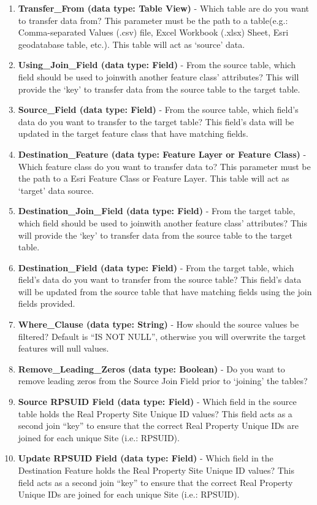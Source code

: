 \documentclass[openany]{book}
\theoremstyle{definition}
\theoremstyle{definition}
\theoremstyle{definition}
\theoremstyle{remark}
\begin{document}
\begin{enumerate}
\def\labelenumi{\arabic{enumi}.}
\item
  \textbf{Transfer\_From (data type: Table View)} - Which table are do
  you want to transfer data from? This parameter must be the path to a
  table(e.g.: Comma-separated Values (.csv) file, Excel Workbook (.xlsx)
  Sheet, Esri geodatabase table, etc.). This table will act as `source'
  data.
\item
  \textbf{Using\_Join\_Field (data type: Field)} - From the source
  table, which field should be used to joinwith another feature class'
  attributes? This will provide the `key' to transfer data from the
  source table to the target table.
\item
  \textbf{Source\_Field (data type: Field)} - From the source table,
  which field's data do you want to transfer to the target table? This
  field's data will be updated in the target feature class that have
  matching fields.
\item
  \textbf{Destination\_Feature (data type: Feature Layer or Feature
  Class)} - Which feature class do you want to transfer data to? This
  parameter must be the path to a Esri Feature Class or Feature Layer.
  This table will act as `target' data source.
\item
  \textbf{Destination\_Join\_Field (data type: Field)} - From the target
  table, which field should be used to joinwith another feature class'
  attributes? This will provide the `key' to transfer data from the
  source table to the target table.
\item
  \textbf{Destination\_Field (data type: Field)} - From the target
  table, which field's data do you want to transfer from the source
  table? This field's data will be updated from the source table that
  have matching fields using the join fields provided.
\item
  \textbf{Where\_Clause (data type: String)} - How should the source
  values be filtered? Default is ``IS NOT NULL'', otherwise you will
  overwrite the target features will null values.
\item
  \textbf{Remove\_Leading\_Zeros (data type: Boolean)} - Do you want to
  remove leading zeros from the Source Join Field prior to `joining' the
  tables?
\item
  \textbf{Source RPSUID Field (data type: Field)} - Which field in the
  source table holds the Real Property Site Unique ID values? This field
  acts as a second join ``key'' to ensure that the correct Real Property
  Unique IDs are joined for each unique Site (i.e.: RPSUID).
\item
  \textbf{Update RPSUID Field (data type: Field)} - Which field in the
  Destination Feature holds the Real Property Site Unique ID values?
  This field acts as a second join ``key'' to ensure that the correct
  Real Property Unique IDs are joined for each unique Site (i.e.:
  RPSUID).
\end{enumerate}
\end{document}
